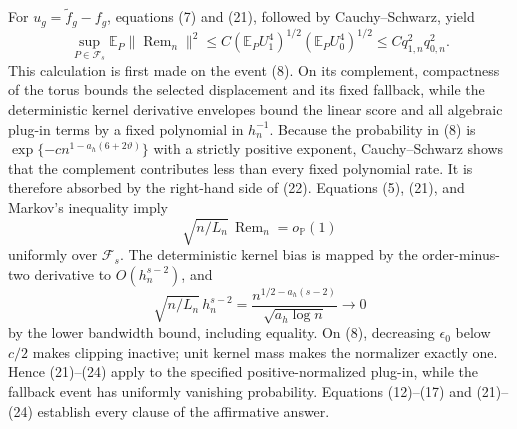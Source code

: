 For \(u_g=\widetilde f_g-f_g\), equations (7) and (21), followed by Cauchy--Schwarz, yield
\[
 \sup_{P\in\mathcal F_s}\mathbb E_P
 \lVert\operatorname{Rem}_n\rVert^2
 \leq C
 \left(\mathbb E_PU_1^4\right)^{1/2}
 \left(\mathbb E_PU_0^4\right)^{1/2}
 \leq Cq_{1,n}^2q_{0,n}^2.
\tag{22}
\]
This calculation is first made on the event (8).  On its complement, compactness of the torus bounds the selected displacement and its fixed fallback, while the deterministic kernel derivative envelopes bound the linear score and all algebraic plug-in terms by a fixed polynomial in \(h_n^{-1}\).  Because the probability in (8) is \(\exp\{-c n^{1-a_h(6+2\vartheta)}\}\) with a strictly positive exponent, Cauchy--Schwarz shows that the complement contributes less than every fixed polynomial rate.  It is therefore absorbed by the right-hand side of (22).
Equations (5), (21), and Markov's inequality imply
\[
 \sqrt{n/L_n}\,\operatorname{Rem}_n=o_{\mathbb P}(1)
\tag{23}
\]
uniformly over \(\mathcal F_s\).  The deterministic kernel bias is mapped by the order-minus-two derivative to \(O(h_n^{s-2})\), and
\[
 \sqrt{n/L_n}\,h_n^{s-2}
 =\frac{n^{1/2-a_h(s-2)}}{\sqrt{a_h\log n}}\longrightarrow0
\tag{24}
\]
by the lower bandwidth bound, including equality.  On (8), decreasing \(\epsilon_0\) below \(c/2\) makes clipping inactive; unit kernel mass makes the normalizer exactly one.  Hence (21)--(24) apply to the specified positive-normalized plug-in, while the fallback event has uniformly vanishing probability.  Equations (12)--(17) and (21)--(24) establish every clause of the affirmative answer.

